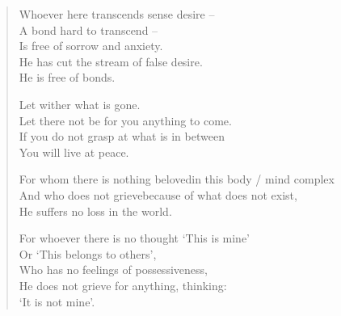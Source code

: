 \begin{verse}

 Whoever here transcends sense desire --\\
A bond hard to transcend --\\
Is free of sorrow and anxiety.\\
He has cut the stream of false desire.\\
He is free of bonds.


 Let wither what is gone.\\
Let there not be for you anything to come.\\
If you do not grasp at what is in between\\
You will live at peace.


 For whom there is nothing beloved\newline in this body / mind complex\\
And who does not grieve\newline because of what does not exist,\\
He suffers no loss in the world.


 For whoever there is no thought `This is mine'\\
Or `This belongs to others',\\
Who has no feelings of possessiveness,\\
He does not grieve for anything, thinking:\\
`It is not mine'.


\end{verse}
